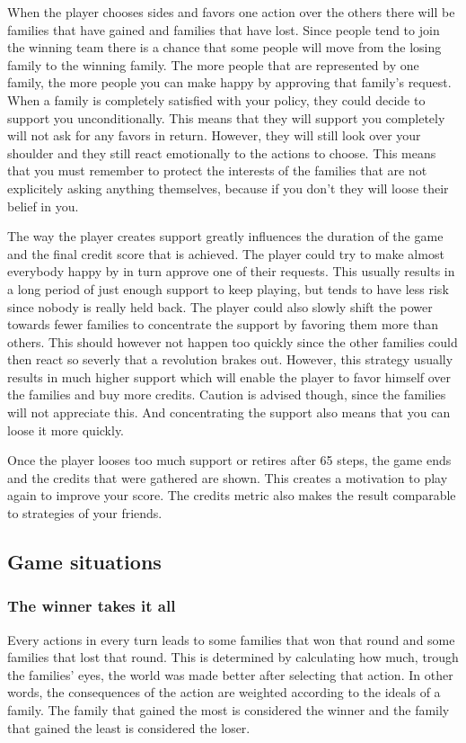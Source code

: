 \documentclass[11pt,a4paper]{article}
\begin{document}
When the player chooses sides and favors one action over the others there will be families that have gained and families that have lost. Since people tend to join the winning team there is a chance that some people will move from the losing family to the winning family. The more people that are represented by one family, the more people you can make happy by approving that family's request. When a family is completely satisfied with your policy, they could decide to support you unconditionally. This means that they will support you completely will not ask for any favors in return. However, they will still look over your shoulder and they still react emotionally to the actions to choose. This means that you must remember to protect the interests of the families that are not explicitely asking anything themselves, because if you don't they will loose their belief in you.

The way the player creates support greatly influences the duration of the game and the final credit score that is achieved. The player could try to make almost everybody happy by in turn approve one of their requests. This usually results in a long period of just enough support to keep playing, but tends to have less risk since nobody is really held back. The player could also slowly shift the power towards fewer families to concentrate the support by favoring them more than others. This should however not happen too quickly since the other families could then react so severly that a revolution brakes out. However, this strategy usually results in much higher support which will enable the player to favor himself over the families and buy more credits. Caution is advised though, since the families will not appreciate this. And concentrating the support also means that you can loose it more quickly.

Once the player looses too much support or retires after 65 steps, the game ends and the credits that were gathered are shown. This creates a motivation to play again to improve your score. The credits metric also makes the result comparable to strategies of your friends.
\subsection{Game situations}

  \subsubsection{The winner takes it all}
Every actions in every turn leads to some families that won that round and some families that lost that round. This is determined by calculating how much, trough the families' eyes, the world was made better after selecting that action. In other words, the consequences of the action are weighted according to the ideals of a family. The family that gained the most is considered the winner and the family that gained the least is considered the loser. 
\end{document}
